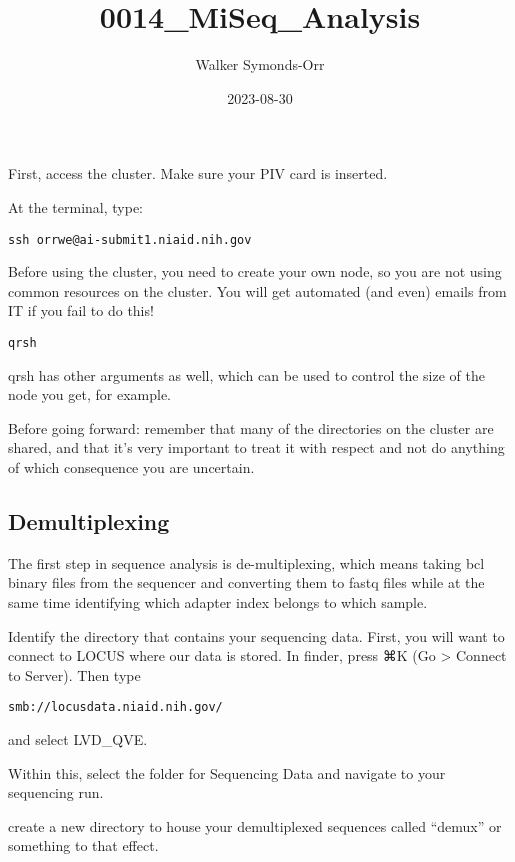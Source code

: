 \documentclass[
]{article}
\title{0014\_MiSeq\_Analysis}
\author{Walker Symonds-Orr}
\date{2023-08-30}
\begin{document}
\maketitle

First, access the cluster. Make sure your PIV card is inserted.

At the terminal, type:

\begin{verbatim}
ssh orrwe@ai-submit1.niaid.nih.gov
\end{verbatim}

Before using the cluster, you need to create your own node, so you are
not using common resources on the cluster. You will get automated (and
even) emails from IT if you fail to do this!

\begin{verbatim}
qrsh
\end{verbatim}

qrsh has other arguments as well, which can be used to control the size
of the node you get, for example.

Before going forward: remember that many of the directories on the
cluster are shared, and that it's very important to treat it with
respect and not do anything of which consequence you are uncertain.

\hypertarget{demultiplexing}{%
\subsection{Demultiplexing}\label{demultiplexing}}

The first step in sequence analysis is de-multiplexing, which means
taking bcl binary files from the sequencer and converting them to fastq
files while at the same time identifying which adapter index belongs to
which sample.

Identify the directory that contains your sequencing data. First, you
will want to connect to LOCUS where our data is stored. In finder, press
⌘K (Go \textgreater{} Connect to Server). Then type

\begin{verbatim}
smb://locusdata.niaid.nih.gov/
\end{verbatim}

and select LVD\_QVE.

Within this, select the folder for Sequencing Data and navigate to your
sequencing run.

create a new directory to house your demultiplexed sequences called
``demux'' or something to that effect.
\end{document}
